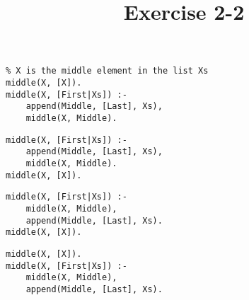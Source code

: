 \documentclass{article}
\title{Exercise 2-2}
\begin{document}
\maketitle


\begin{lstlisting}[caption=Unaltered middle predicate]
% middle(X,Xs)
% X is the middle element in the list Xs
middle(X, [X]).
middle(X, [First|Xs]) :-
    append(Middle, [Last], Xs),
    middle(X, Middle).
\end{lstlisting}


\begin{lstlisting}[caption=Altered version 1]
middle(X, [First|Xs]) :-
    append(Middle, [Last], Xs),
    middle(X, Middle).
middle(X, [X]).
\end{lstlisting}

\begin{lstlisting}[caption=Altered version 2]
middle(X, [First|Xs]) :-
    middle(X, Middle),
    append(Middle, [Last], Xs).
middle(X, [X]).
\end{lstlisting}


\begin{lstlisting}[caption=Altered version 3]
middle(X, [X]).
middle(X, [First|Xs]) :-
    middle(X, Middle),
    append(Middle, [Last], Xs).
\end{lstlisting}
\end{document}
